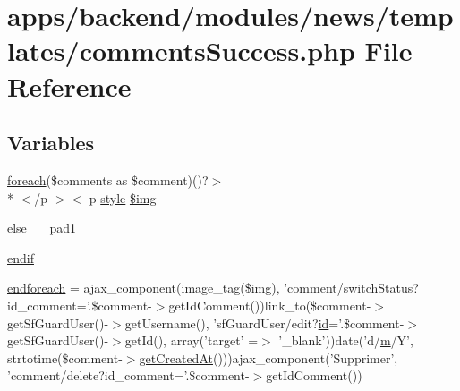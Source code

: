 \hypertarget{comments_success_8php}{\section{apps/backend/modules/news/templates/comments\-Success.php File Reference}
\label{comments_success_8php}
}
\subsection*{Variables}
\begin{DoxyCompactItemize}
\item 
\hyperlink{presse_2modules_2news_2templates_2index_success_8php_abc56db52b2e9a59bcd5c9e45ac5cb332}{foreach}(\$comments as \$comment)()?$>$\\*
$<$/p $>$$<$ p \hyperlink{backend_2modules_2news_2templates_2__form_8php_a8ba9b58991c02462588258e164fe3f84}{style} \hyperlink{comments_success_8php_a77e427c53a11cc33159e8e019202ef61}{\$img}
\item 
\hyperlink{live_2modules_2team_2templates_2management_success_8php_a0544c3fe466e421738dae463968b70ba}{else} \hyperlink{comments_success_8php_ae8b4bb1441c6ab4dcb28a37bc46c8ead}{\-\_\-\-\_\-pad1\-\_\-\-\_\-}
\item 
\hyperlink{comments_success_8php_a82cd33ca97ff99f2fcc5e9c81d65251b}{endif}
\item 
\hyperlink{comments_success_8php_a672d9707ef91db026c210f98cc601123}{endforeach} = ajax\-\_\-component(image\-\_\-tag(\$img), 'comment/switch\-Status?id\-\_\-comment='.\$comment-\/$>$get\-Id\-Comment())link\-\_\-to(\$comment-\/$>$get\-Sf\-Guard\-User()-\/$>$get\-Username(), 'sf\-Guard\-User/edit?\hyperlink{live_2modules_2team_2templates_2management_success_8php_ad9851c94d15b310fef9eaded57c23ddf}{id}='.\$comment-\/$>$get\-Sf\-Guard\-User()-\/$>$get\-Id(), array('target' =$>$ '\-\_\-blank'))date('d/\hyperlink{frontend_2modules_2poker__tournament_2templates_2view_success_8php_a128ba33893be6a113de6d7895ff5d641}{m}/Y', strtotime(\$comment-\/$>$\hyperlink{live_2modules_2news_2templates_2view_success_8php_a684dd27287fcedcbe91ff8c7cc23f3bb}{get\-Created\-At}()))ajax\-\_\-component('Supprimer', 'comment/delete?id\-\_\-comment='.\$comment-\/$>$get\-Id\-Comment())
\end{DoxyCompactItemize}



